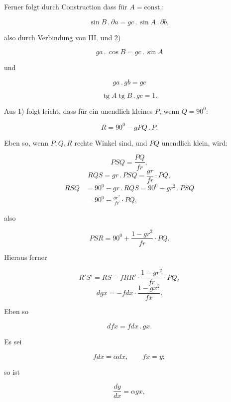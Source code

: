 %
\begin{center}\end{center}

\noindent Ferner folgt durch Construction dass f\"ur $A = \text{const.}$:

\[
\sin B\,.\,\partial a = gc\,.\,\sin A\,.\,\partial b,
\]

\noindent also durch Verbindung von III. und 2)

\[
ga\,.\,\cos B = gc\,.\,\sin A
\]

\noindent und

\[
\tag*{3)} ga\,.\,gb = gc
\]

\[
\tag*{4)} \operatorname{tg}A\operatorname{tg}B\,.\,gc = 1.
\]

\begin{center}\end{center}

\noindent Aus 1) folgt leicht, dass f\"ur ein unendlich kleines $P$, wenn $Q=90^{0}$:

\[
R = 90^{0} - gPQ\,.\,P.
\]

\begin{center}\end{center}

\noindent Eben so, wenn $P,Q,R$ rechte Winkel sind, und $PQ$ unendlich klein, wird:

\[
PSQ = \frac{PQ}{fr},
\]
\[
RQS = gr\,.\,PSQ = \frac{gr}{fr}\cdot PQ,
\]
\[
\begin{aligned}RSQ &= 90^{0} - gr\,.\,RQS = 90^{0} - gr^{2}\,.\,PSQ\\ &= 90^{0} - \frac{gr^{2}}{fr}\cdot PQ,\end{aligned}
\]

\noindent also

\[
PSR = 90^{0} + \frac{1-gr^{2}}{fr}\cdot PQ.
\]

\begin{center}\end{center}

\noindent Hieraus ferner

\[
R'S' = RS - fRR'\cdot\frac{1-gr^{2}}{fr}\cdot PQ,
\]
\[
dgx = -fdx\cdot\frac{1-gx^{2}}{fx}.
\]

\noindent Eben so

\begin{center}\end{center}

\[
dfx = fdx\,.\,gx.
\]

\noindent Es sei

\[
fdx = \alpha dx, \qquad fx = y;
\]

\noindent so ist

\[
\frac{dy}{dx} = \alpha gx,
\]
